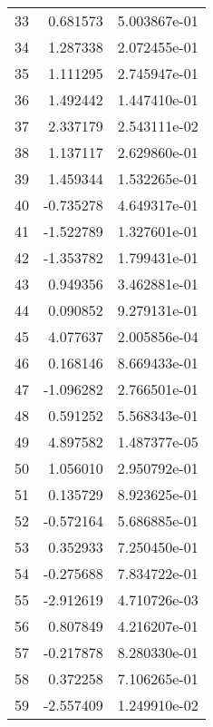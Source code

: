 \begin{tabular}{lrr}
33 &   0.681573 &  5.003867e-01 \\
34 &   1.287338 &  2.072455e-01 \\
35 &   1.111295 &  2.745947e-01 \\
36 &   1.492442 &  1.447410e-01 \\
37 &   2.337179 &  2.543111e-02 \\
38 &   1.137117 &  2.629860e-01 \\
39 &   1.459344 &  1.532265e-01 \\
40 &  -0.735278 &  4.649317e-01 \\
41 &  -1.522789 &  1.327601e-01 \\
42 &  -1.353782 &  1.799431e-01 \\
43 &   0.949356 &  3.462881e-01 \\
44 &   0.090852 &  9.279131e-01 \\
45 &   4.077637 &  2.005856e-04 \\
46 &   0.168146 &  8.669433e-01 \\
47 &  -1.096282 &  2.766501e-01 \\
48 &   0.591252 &  5.568343e-01 \\
49 &   4.897582 &  1.487377e-05 \\
50 &   1.056010 &  2.950792e-01 \\
51 &   0.135729 &  8.923625e-01 \\
52 &  -0.572164 &  5.686885e-01 \\
53 &   0.352933 &  7.250450e-01 \\
54 &  -0.275688 &  7.834722e-01 \\
55 &  -2.912619 &  4.710726e-03 \\
56 &   0.807849 &  4.216207e-01 \\
57 &  -0.217878 &  8.280330e-01 \\
58 &   0.372258 &  7.106265e-01 \\
59 &  -2.557409 &  1.249910e-02 \\
\bottomrule
\end{tabular}
